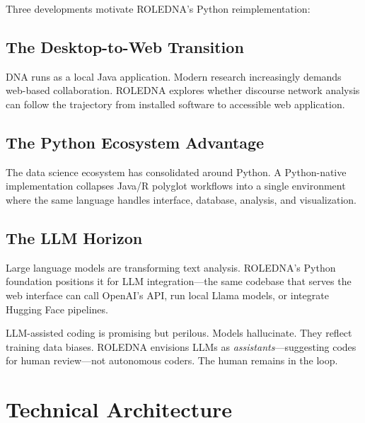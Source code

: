 \documentclass[../main.tex]{subfiles}
\begin{document}

Three developments motivate ROLEDNA's Python reimplementation:

\subsection*{The Desktop-to-Web Transition}

DNA runs as a local Java application. Modern research increasingly demands web-based collaboration. ROLEDNA explores whether discourse network analysis can follow the trajectory from installed software to accessible web application.

\subsection*{The Python Ecosystem Advantage}

The data science ecosystem has consolidated around Python. A Python-native implementation collapses Java/R polyglot workflows into a single environment where the same language handles interface, database, analysis, and visualization.

\subsection*{The LLM Horizon}

Large language models are transforming text analysis. ROLEDNA's Python foundation positions it for LLM integration---the same codebase that serves the web interface can call OpenAI's API, run local Llama models, or integrate Hugging Face pipelines.

\begin{criticalbox}
LLM-assisted coding is promising but perilous. Models hallucinate. They reflect training data biases. ROLEDNA envisions LLMs as \emph{assistants}---suggesting codes for human review---not autonomous coders. The human remains in the loop.
\end{criticalbox}


\section*{Technical Architecture}
\end{document}
